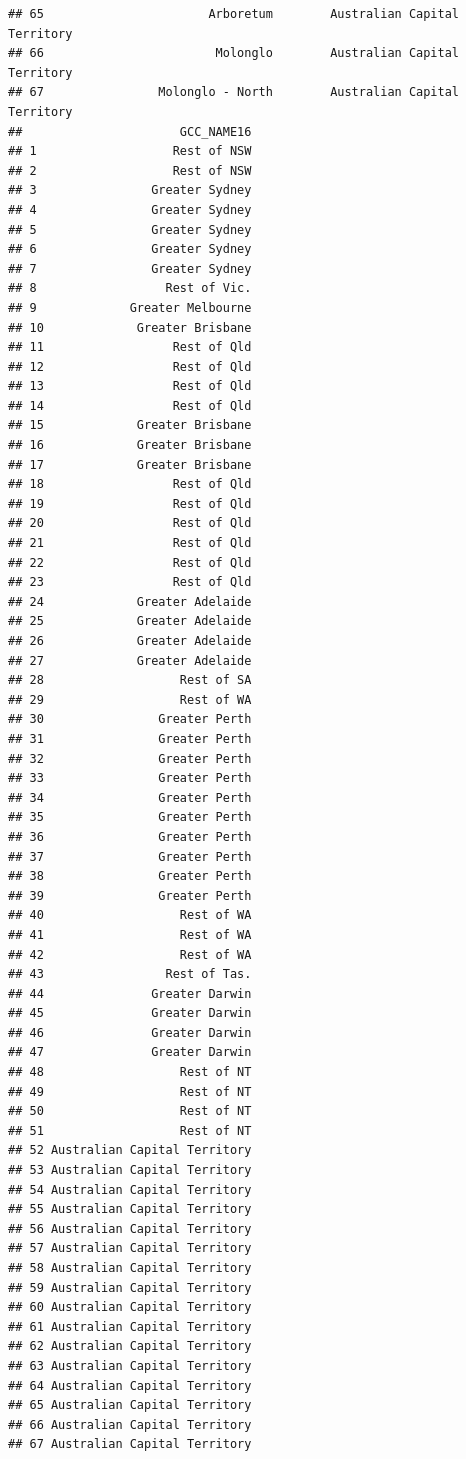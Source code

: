 \documentclass[]{article}
\begin{document}
\begin{verbatim}
## 65                       Arboretum        Australian Capital Territory
## 66                        Molonglo        Australian Capital Territory
## 67                Molonglo - North        Australian Capital Territory
##                      GCC_NAME16
## 1                   Rest of NSW
## 2                   Rest of NSW
## 3                Greater Sydney
## 4                Greater Sydney
## 5                Greater Sydney
## 6                Greater Sydney
## 7                Greater Sydney
## 8                  Rest of Vic.
## 9             Greater Melbourne
## 10             Greater Brisbane
## 11                  Rest of Qld
## 12                  Rest of Qld
## 13                  Rest of Qld
## 14                  Rest of Qld
## 15             Greater Brisbane
## 16             Greater Brisbane
## 17             Greater Brisbane
## 18                  Rest of Qld
## 19                  Rest of Qld
## 20                  Rest of Qld
## 21                  Rest of Qld
## 22                  Rest of Qld
## 23                  Rest of Qld
## 24             Greater Adelaide
## 25             Greater Adelaide
## 26             Greater Adelaide
## 27             Greater Adelaide
## 28                   Rest of SA
## 29                   Rest of WA
## 30                Greater Perth
## 31                Greater Perth
## 32                Greater Perth
## 33                Greater Perth
## 34                Greater Perth
## 35                Greater Perth
## 36                Greater Perth
## 37                Greater Perth
## 38                Greater Perth
## 39                Greater Perth
## 40                   Rest of WA
## 41                   Rest of WA
## 42                   Rest of WA
## 43                 Rest of Tas.
## 44               Greater Darwin
## 45               Greater Darwin
## 46               Greater Darwin
## 47               Greater Darwin
## 48                   Rest of NT
## 49                   Rest of NT
## 50                   Rest of NT
## 51                   Rest of NT
## 52 Australian Capital Territory
## 53 Australian Capital Territory
## 54 Australian Capital Territory
## 55 Australian Capital Territory
## 56 Australian Capital Territory
## 57 Australian Capital Territory
## 58 Australian Capital Territory
## 59 Australian Capital Territory
## 60 Australian Capital Territory
## 61 Australian Capital Territory
## 62 Australian Capital Territory
## 63 Australian Capital Territory
## 64 Australian Capital Territory
## 65 Australian Capital Territory
## 66 Australian Capital Territory
## 67 Australian Capital Territory
\end{verbatim}
\end{document}
